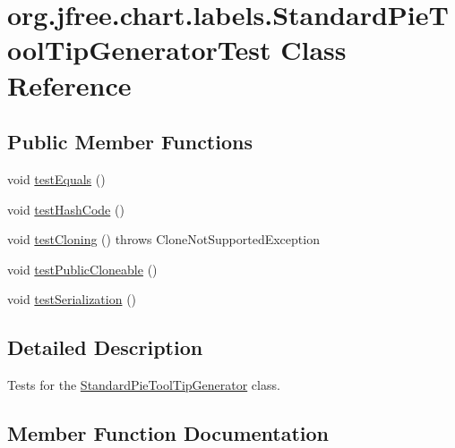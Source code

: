\hypertarget{classorg_1_1jfree_1_1chart_1_1labels_1_1_standard_pie_tool_tip_generator_test}{}\section{org.\+jfree.\+chart.\+labels.\+Standard\+Pie\+Tool\+Tip\+Generator\+Test Class Reference}
\label{classorg_1_1jfree_1_1chart_1_1labels_1_1_standard_pie_tool_tip_generator_test}
\subsection*{Public Member Functions}
\begin{DoxyCompactItemize}
\item 
void \mbox{\hyperlink{classorg_1_1jfree_1_1chart_1_1labels_1_1_standard_pie_tool_tip_generator_test_acea498f2dacdbb4dc0bd8d51509219c0}{test\+Equals}} ()
\item 
void \mbox{\hyperlink{classorg_1_1jfree_1_1chart_1_1labels_1_1_standard_pie_tool_tip_generator_test_a73393dab86bd302f2e61f800307ece2c}{test\+Hash\+Code}} ()
\item 
void \mbox{\hyperlink{classorg_1_1jfree_1_1chart_1_1labels_1_1_standard_pie_tool_tip_generator_test_a0ce629a057a2401aaa5c0f864b68c6bb}{test\+Cloning}} ()  throws Clone\+Not\+Supported\+Exception 
\item 
void \mbox{\hyperlink{classorg_1_1jfree_1_1chart_1_1labels_1_1_standard_pie_tool_tip_generator_test_a775d78abd090b4ffc8eaab0b339d2da1}{test\+Public\+Cloneable}} ()
\item 
void \mbox{\hyperlink{classorg_1_1jfree_1_1chart_1_1labels_1_1_standard_pie_tool_tip_generator_test_a4a8cb1a0a7f4e1850928ca0cf50637fa}{test\+Serialization}} ()
\end{DoxyCompactItemize}


\subsection{Detailed Description}
Tests for the \mbox{\hyperlink{classorg_1_1jfree_1_1chart_1_1labels_1_1_standard_pie_tool_tip_generator}{Standard\+Pie\+Tool\+Tip\+Generator}} class. 

\subsection{Member Function Documentation}
\mbox{\label{classorg_1_1jfree_1_1chart_1_1labels_1_1_standard_pie_tool_tip_generator_test_a0ce629a057a2401aaa5c0f864b68c6bb}} 
